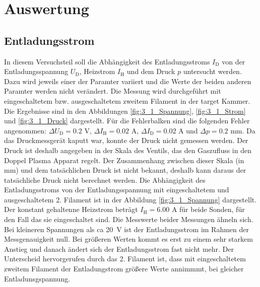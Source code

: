 \section{Auswertung}
\subsection{Entladungsstrom}\label{sec:Entladungsstrom}
In diesem Versuchsteil soll die Abhängigkeit des Entladungsstroms  $I_{\mathrm{D}}$ von der Entladungsspannung $U_{\mathrm{D}}$, Heizstrom $I_{\mathrm{H}}$ und dem Druck $p$ untersucht werden. Dazu wird jeweils einer der Paramter variiert und die Werte der beiden anderen Paramter werden nicht verändert. Die Messung wird durchgeführt mit eingeschaltetem bzw. ausgeschaltetem  zweitem Filament in der target Kammer. Die Ergebnisse sind in den Abbildungen \ref{fig:3_1_Spannung}, \ref{fig:3_1_Strom} und \ref{fig:3_1_Druck} dargestellt. Für die Fehlerbalken sind die folgenden Fehler angenommen: $\Delta U_{\mathrm{D}} = 0.2 $ V, $\Delta I_{\mathrm{H}} = 0.02$ A, $\Delta I_{\mathrm{D}} = 0.02$ A und  $\Delta p = 0.2 $ mm. Da das Druckmessgerät kaputt war, konnte der Druck nicht gemessen werden. Der Druck ist deshalb angegeben in der Skala des Ventils, das den Gaszufluss in den Doppel Plasma Apparat regelt. Der Zusammenhang zwischen dieser Skala (in mm) und dem tatsächlichen Druck ist nicht bekannt, deshalb kann daraus der tatsächliche Druck nicht berechnet werden. Die Abhängigkeit des Entladungsstroms von der Entladungsspannung mit eingeschaltetem und ausgeschaltetem 2. Filament ist in der Abbildung \ref{fig:3_1_Spannung} dargestellt. Der konstant gehaltenne Heizstrom beträgt $ I_{\mathrm{H}} =6.00$ A für beide Sonden, für den Fall das sie eingeschaltet sind. Die Messwerte beider Messungen ähneln sich. Bei kleineren Spannungen als ca \SI{20}{V} ist der Entladungsstrom im Rahmen der Messgenauigkeit null. Bei größeren Werten kommt es erst zu einem sehr starkem Anstieg und danach ändert sich der Entladungsstrom fast nicht mehr. Der Unterscheid hervorgerufen durch das 2. Filament ist, dass mit eingeschaltetem zweitem Filament der Entladungstrom größere Werte annimmmt, bei gleicher Entladunsgspannung.  

